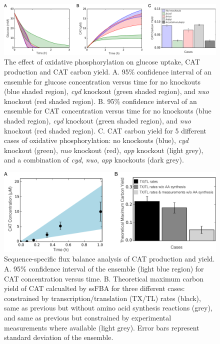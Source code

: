\documentclass[12pt]{article}
\begin{document}
\begin{figure}[ht]
\centering
\includegraphics[width=1\textwidth]{./Figures/oxphos_ko.pdf}
\caption{The effect of oxidative phosphorylation on glucose uptake, CAT production and CAT carbon yield. A. 95\% confidence interval of an ensemble for glucose concentration versus time for no knockouts (blue shaded region), \textit{cyd} knockout (green shaded region), and \textit{nuo} knockout (red shaded region). B. 95\% confidence interval of an ensemble for CAT concentration versus time for no knockouts (blue shaded region), \textit{cyd} knockout (green shaded region), and \textit{nuo} knockout (red shaded region). C. CAT carbon yield for 5 different cases of oxidative phosphorylation: no knockouts (blue), \textit{cyd} knockout (green), \textit{nuo} knockout (red), \textit{app} knockout (light grey), and a combination of \textit{cyd}, \textit{nuo}, \textit{app} knockouts (dark grey).}
\label{fig:oxphos_ko}
\end{figure}
\clearpage

\begin{figure}[ht]
\centering
\includegraphics[width=1\textwidth]{./Figures/CAT_prod_yield.pdf}
\caption{Sequence-specific flux balance analysis of CAT production and yield. A. 95\% confidence interval of the ensemble (light blue region) for CAT concentration versus time. B. Theoretical maximum carbon yield of CAT calcualted by ssFBA for three different cases: constrained by transcription/translation (TX/TL) rates (black), same as previous but without amino acid synthesis reactions (grey), and same as previous but constrained by experimental measurements where available (light grey). Error bars represent standard deviation of the ensemble.}
\label{fig:CATProdYield}
\end{figure}
\clearpage
\end{document}
